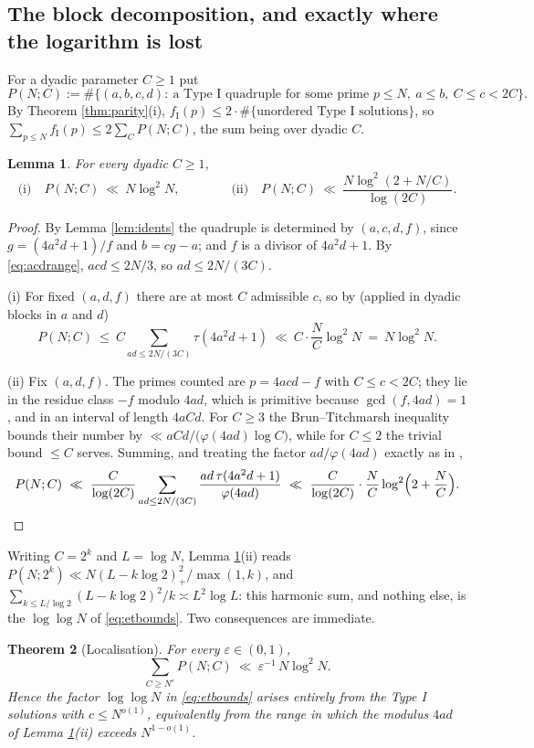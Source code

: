 \documentclass[11pt,reqno]{amsart}
\theoremstyle{plain}
\newtheorem{theorem}{Theorem}[section]
\newtheorem{lemma}[theorem]{Lemma}
\theoremstyle{definition}
\numberwithin{equation}{section}
\newcommand{\fI}{f_{\mathrm{I}}}
\begin{document}
\subsection{The block decomposition, and exactly where the logarithm is lost}
For a dyadic parameter $C\ge1$ put
\[
  P(N;C):=\#\{(a,b,c,d):\ \text{a Type I quadruple for some prime }p\le N,\
  a\le b,\ C\le c<2C\}.
\]
By Theorem \ref{thm:parity}(i), $\fI(p)\le2\cdot\#\{\text{unordered Type I solutions}\}$,
so $\sum_{p\le N}\fI(p)\le2\sum_{C}P(N;C)$, the sum being over dyadic $C$.

\begin{lemma}\label{lem:block}
For every dyadic $C\ge1$,
\[
  \text{(i)}\quad P(N;C)\ \ll\ N\log^{2}N,
  \qquad\qquad
  \text{(ii)}\quad P(N;C)\ \ll\ \frac{N\log^{2}(2+N/C)}{\log(2C)} .
\]
\end{lemma}

\begin{proof}
By Lemma \ref{lem:idents} the quadruple is determined by $(a,c,d,f)$, since
$g=(4a^{2}d+1)/f$ and $b=cg-a$; and $f$ is a divisor of $4a^{2}d+1$. By
\eqref{eq:acdrange}, $acd\le2N/3$, so $ad\le 2N/(3C)$.

(i) For fixed $(a,d,f)$ there are at most $C$ admissible $c$, so by
\cite[Prop.~1.4]{ElsholtzTao} (applied in dyadic blocks in $a$ and $d$)
\[
  P(N;C)\ \le\ C\!\!\sum_{ad\le 2N/(3C)}\!\!\tau(4a^{2}d+1)\ \ll\ C\cdot\frac NC\log^{2}N
  \ =\ N\log^{2}N .
\]

(ii) Fix $(a,d,f)$. The primes counted are $p=4acd-f$ with $C\le c<2C$; they lie in the
residue class $-f$ modulo $4ad$, which is primitive because $\gcd(f,4ad)=1$, and in an
interval of length $4aCd$. For $C\ge3$ the Brun--Titchmarsh inequality
\cite{MontgomeryVaughan} bounds their number by
$\ll aCd/\bigl(\varphi(4ad)\log C\bigr)$, while for $C\le2$ the trivial bound $\le C$
serves. Summing, and treating the factor $ad/\varphi(4ad)$ exactly as in
\cite[(8.2)]{ElsholtzTao},
\[
  P(N;C)\ \ll\ \frac{C}{\log(2C)}\sum_{ad\le2N/(3C)}\frac{ad\,\tau(4a^{2}d+1)}{\varphi(4ad)}
  \ \ll\ \frac{C}{\log(2C)}\cdot\frac NC\log^{2}\Bigl(2+\frac NC\Bigr).\qedhere
\]
\end{proof}

Writing $C=2^{k}$ and $L=\log N$, Lemma \ref{lem:block}(ii) reads
$P(N;2^{k})\ll N(L-k\log2)_{+}^{2}/\max(1,k)$, and
$\sum_{k\le L/\log2}(L-k\log2)^{2}/k\asymp L^{2}\log L$: this harmonic sum, and nothing
else, is the $\log\log N$ of \eqref{eq:etbounds}. Two consequences are immediate.

\begin{theorem}[Localisation]\label{thm:loc}
For every $\varepsilon\in(0,1)$,
\[
  \sum_{C\ge N^{\varepsilon}}P(N;C)\ \ll\ \varepsilon^{-1}\,N\log^{2}N .
\]
Hence the factor $\log\log N$ in \eqref{eq:etbounds} arises entirely from the Type I
solutions with $c\le N^{o(1)}$, equivalently from the range in which the modulus $4ad$
of Lemma \ref{lem:block}(ii) exceeds $N^{1-o(1)}$.
\end{theorem}
\end{document}
